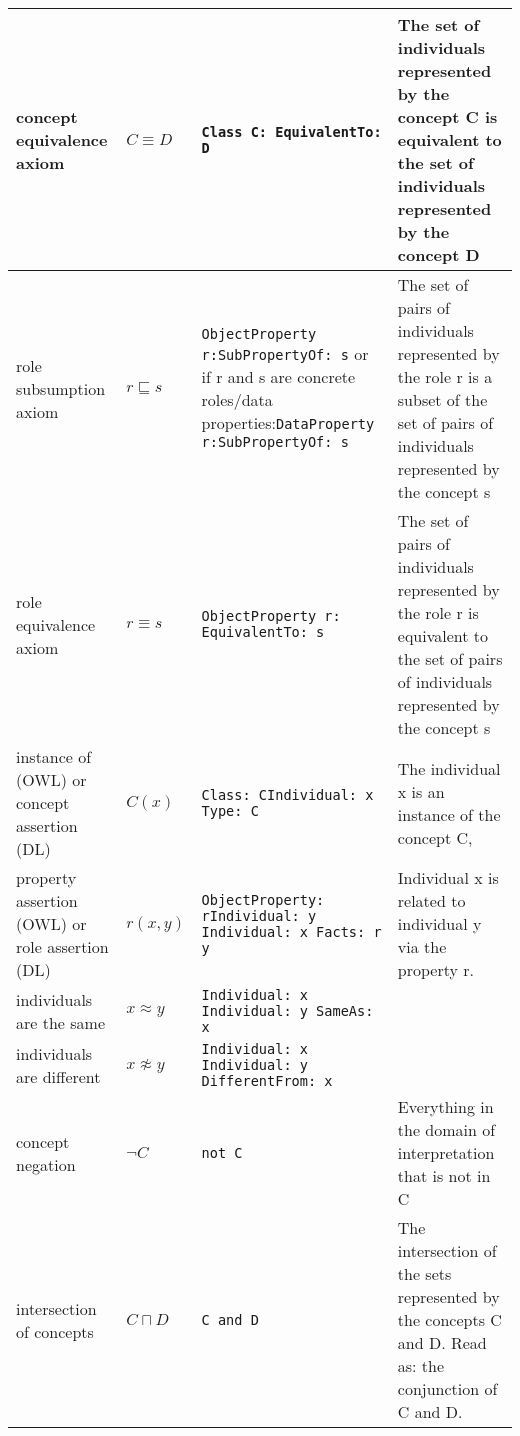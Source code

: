 \documentclass{amsart}
\begin{document}
\begin{longtable}{|>{\footnotesize}p{2cm}|>{\footnotesize}p{1.3cm}|>{\footnotesize}p{4cm}|>{\footnotesize}p{5cm}|}
			\hline	
			concept equivalence axiom & $C \equiv D$ & \texttt{Class C: \newline EquivalentTo: D} & The set of individuals represented by the concept C is equivalent to the set of individuals represented by the concept D\\
			\hline
			role subsumption axiom & $r \sqsubseteq s$ & \texttt{ObjectProperty r:\newline SubPropertyOf: s} or if r and s are concrete roles/data properties:\newline \texttt{DataProperty r:\newline SubPropertyOf: s} & The set of pairs of individuals represented by the role r is a subset of the set of pairs of individuals represented by the concept s\\
			\hline	
			role equivalence axiom & $r \equiv s$ & \texttt{ObjectProperty r: \newline EquivalentTo: s} & The set of pairs of individuals represented by the role r is equivalent to the set of pairs of individuals represented by the concept s\\
			\hline
			instance of (OWL) or concept assertion (DL) & $C(x)$ & \texttt{Class: C\newline Individual: x \newline Type: C} & The individual x is an instance of the concept C, \\
			\hline
			property assertion (OWL) or role assertion (DL) & $r(x, y)$ & \texttt{ObjectProperty: r\newline Individual: y \newline Individual: x \newline Facts: r y}  &  Individual x is related to individual y via the property r.\\  
			\hline
			individuals are the same & $x \approx y$ & \texttt{Individual: x \newline Individual: y \newline SameAs: x}& \\ 		
			\hline	
			individuals are different & $x \not\approx y$ & \texttt{Individual: x \newline Individual: y \newline DifferentFrom: x} & \\ 		
			\hline					
			concept negation & $\neg C$ & \texttt{not C} & Everything in the domain of interpretation that is not in C \\
			\hline			
			intersection of concepts & $C \sqcap D$ & \texttt{C and D} & The intersection of the sets represented by the concepts C and D. Read as: the conjunction of C and D.\\

\end{longtable}
\end{document}
